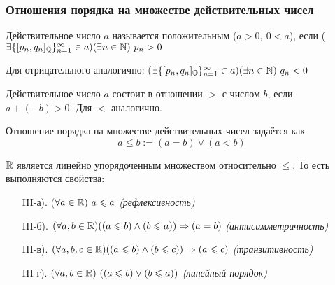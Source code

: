 \subsubsection*{Отношения порядка на множестве действительных чисел}

\begin{definition}
    Действительное число $a$ называется 
    положительным ($a > 0,\  0 < a$), если
    ($\exists \{[p_n, q_n]_{\mathbb{Q}}\}_{n = 1}^{\infty} \in a)
    (\exists n \in \mathbb{N})\ p_n > 0$

    Для отрицательного аналогично:
    ($\exists \{[p_n, q_n]_{\mathbb{Q}}\}_{n = 1}^{\infty} \in a)
    (\exists n \in \mathbb{N})\ q_n < 0$
\end{definition}

\begin{definition}
    Действительное число $a$ состоит в отношении $>$ с
    числом $b$, если $a + (-b) > 0$. Для $<$ аналогично.
\end{definition}

\begin{definition}
    Отношение порядка на множестве действительных
    чисел задаётся как
    \[
        a \le b := (a = b) \vee (a < b)
    \]
\end{definition}

\begin{theorem}
    $\mathbb{R}$ является линейно упорядоченным множеством
    относительно $\le$. То есть выполняются свойства:

    \begin{enumerate}
        \item[III-а).] ($\forall a \in \mathbb{R})\ a \leqslant a$ \textit{(рефлексивность)}
        \item[III-б).] $(\forall a, b \in \mathbb{R})((a \leqslant b) \wedge 
            (b \leqslant a)) \Rightarrow (a = b)$ \textit{(антисимметричность)}
        \item[III-в).] $(\forall a, b, c \in \mathbb{R})((a \leqslant b)
            \wedge (b \leqslant c)) \Rightarrow (a \leqslant c)$ \textit{(транзитивность)}
        \item[III-г).] $(\forall a, b \in \mathbb{R})\ ((a \leqslant b) \vee (b \leqslant a))$ \textit{(линейный порядок)}
    \end{enumerate}
\end{theorem}

